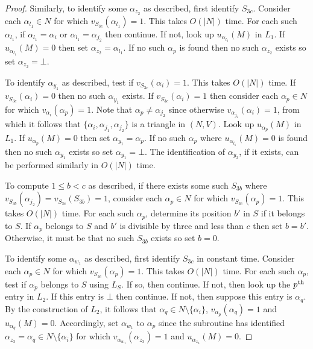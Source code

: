 \begin{proof}
 Similarly, to identify some $\alpha_{z_2}$ as described, first identify $S_{3c}$. Consider each $\alpha_{l_1}\in N$ for which $v_{S_{3c}}(\alpha_{l_1})=1$. This takes $O(|N|)$ time. For each such $\alpha_{l_1}$, if $\alpha_{l_1}=\alpha_i$ or $\alpha_{l_1}=\alpha_{j_2}$ then continue. If not, look up $u_{\alpha_{l_1}}(M)$ in $L_1$. If $u_{\alpha_{l_1}}(M)=0$ then set $\alpha_{z_2}=\alpha_{l_1}$. If no such $\alpha_{p}$ is found then no such $\alpha_{z_2}$ exists so set $\alpha_{z_2}=\bot$.
 
 To identify $\alpha_{y_1}$ as described, test if $v_{S_{3c}}(\alpha_{i})=1$. This takes $O(|N|)$ time. If $v_{S_{3c}}(\alpha_{i})=0$ then no such $\alpha_{y_1}$ exists. If $v_{S_{3c}}(\alpha_{i})=1$ then consider each $\alpha_{p}\in N$ for which $v_{\alpha_{i}}(\alpha_{p})=1$. Note that $\alpha_p\neq \alpha_{j_2}$ since otherwise $v_{\alpha_{j_2}}(\alpha_{i})=1$, from which it follows that $\{ \alpha_i, \alpha_{j_1}, \alpha_{j_2} \}$ is a triangle in $(N, V)$. Look up $u_{\alpha_{p}}(M)$ in $L_1$. If $u_{\alpha_{p}}(M)=0$ then set $\alpha_{y_1}=\alpha_{p}$. If no such $\alpha_{p}$ where $u_{\alpha_{l_1}}(M)=0$ is found then no such $\alpha_{y_1}$ exists so set $\alpha_{y_1}=\bot$. The identification of $\alpha_{y_2}$, if it exists, can be performed similarly in $O(|N|)$ time.
 
 To compute $1 \leq b < c$ as described, if there exists some such $S_{3b}$ where $v_{S_{3b}}(\alpha_{j_2})=v_{S_{3c}}(S_{3b})=1$, consider each $\alpha_{p}\in N$ for which $v_{S_{3c}}(\alpha_{p})=1$. This takes $O(|N|)$ time. For each such $\alpha_{p}$, determine its position $b'$ in $S$ if it belongs to $S$. If $\alpha_{p}$ belongs to $S$ and $b'$ is divisible by three and less than $c$ then set $b=b'$. Otherwise, it must be that no such $S_{3b}$ exists so set $b=0$.
 
To identify some $\alpha_{w_1}$ as described, first identify $S_{3c}$ in constant time. Consider each $\alpha_{p}\in N$ for which $v_{S_{3c}}(\alpha_{p})=1$. This takes $O(|N|)$ time. For each such $\alpha_{p}$, test if $\alpha_{p}$ belongs to $S$ using $L_S$. If so, then continue. If not, then look up the $p\textsuperscript{th}$ entry in $L_2$. If this entry is $\bot$ then continue. If not, then suppose this entry is $\alpha_{q}$. By the construction of $L_2$, it follows that $\alpha_{q}\in N \setminus \{ \alpha_i \}$, $v_{\alpha_{p}}(\alpha_{q})=1$ and $u_{\alpha_{q}}(M)=0$. Accordingly, set $\alpha_{w_1}$ to $\alpha_{p}$ since the subroutine has identified $\alpha_{z_3}=\alpha_{q}\in N \setminus \{ \alpha_i \}$ for which $v_{\alpha_{w_1}}(\alpha_{z_3})=1$ and $u_{\alpha_{z_3}}(M)=0$.


\end{proof}
